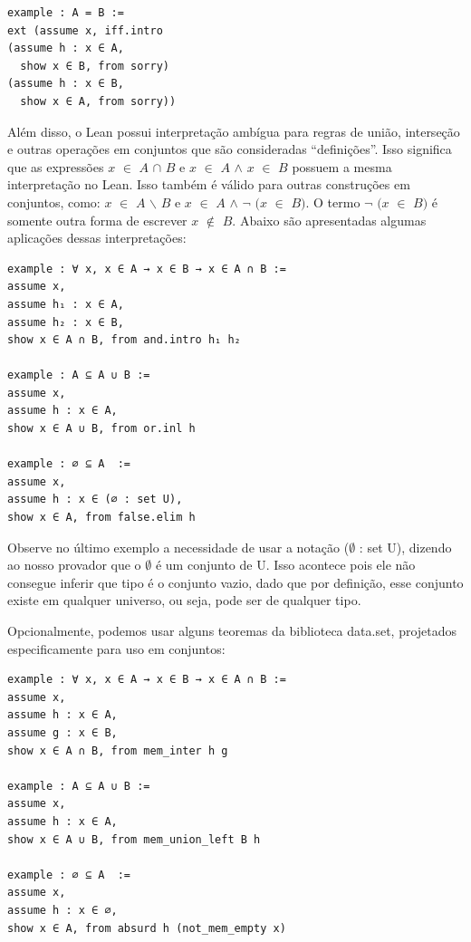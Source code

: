 \begin{lstlisting}
example : A = B :=
ext (assume x, iff.intro
(assume h : x ∈ A,
  show x ∈ B, from sorry)
(assume h : x ∈ B,
  show x ∈ A, from sorry)) \end{lstlisting}

Além disso, o Lean possui interpretação ambígua para regras de união, interseção e outras operações em conjuntos que são consideradas “definições”. Isso significa que as expressões $x$ $\in$ $A$ $\cap$ $B$ e $x$ $\in$ $A$ $\wedge$ $x$ $\in$ $B$ possuem a mesma interpretação no Lean. Isso também é válido para outras construções em conjuntos, como: $x$ $\in$ $A$ $\backslash $ $B$ e $x$ $\in$ $A$ $\wedge$ $\neg$ $(x$ $\in$ $B)$. O termo $\neg$ $(x$ $\in$ $B)$ é somente outra forma de escrever $x$ $\notin$ $B$. Abaixo são apresentadas algumas aplicações dessas interpretações:

\begin{lstlisting}
example : ∀ x, x ∈ A → x ∈ B → x ∈ A ∩ B :=
assume x,
assume h₁ : x ∈ A,
assume h₂ : x ∈ B,
show x ∈ A ∩ B, from and.intro h₁ h₂

example : A ⊆ A ∪ B :=
assume x,
assume h : x ∈ A,
show x ∈ A ∪ B, from or.inl h

example : ∅ ⊆ A  :=
assume x,
assume h : x ∈ (∅ : set U),
show x ∈ A, from false.elim h \end{lstlisting}

Observe no último exemplo a necessidade de usar a notação { \selectfont ($\emptyset$ : set U)}, dizendo ao nosso provador que o $\emptyset$ é um conjunto de{
\selectfont U}. Isso acontece pois ele não consegue inferir que tipo é o conjunto vazio, dado que por definição, esse conjunto existe em qualquer universo, ou seja, pode ser de qualquer tipo.

Opcionalmente, podemos usar alguns teoremas da biblioteca {
\selectfont data.set}, projetados especificamente para uso em conjuntos:

\begin{lstlisting}
example : ∀ x, x ∈ A → x ∈ B → x ∈ A ∩ B :=
assume x,
assume h : x ∈ A,
assume g : x ∈ B,
show x ∈ A ∩ B, from mem_inter h g

example : A ⊆ A ∪ B :=
assume x,
assume h : x ∈ A,
show x ∈ A ∪ B, from mem_union_left B h

example : ∅ ⊆ A  :=
assume x,
assume h : x ∈ ∅,
show x ∈ A, from absurd h (not_mem_empty x) \end{lstlisting}

